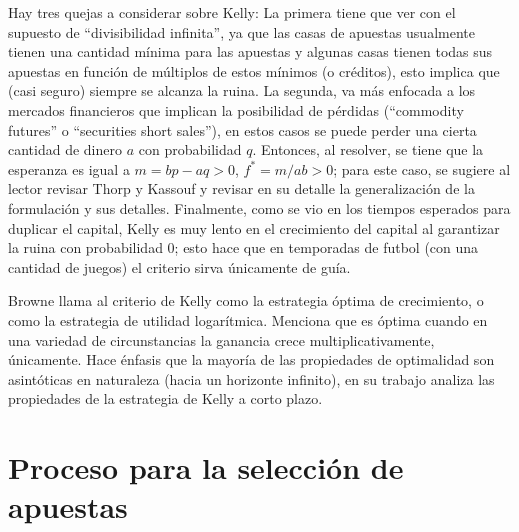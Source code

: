 Hay tres quejas a considerar sobre Kelly: La primera tiene que ver con el supuesto de ``divisibilidad infinita'', ya que las casas de apuestas usualmente tienen una cantidad mínima para las apuestas y algunas casas tienen todas sus apuestas en función de múltiplos de estos mínimos (o créditos), esto implica que  (casi seguro) siempre se alcanza la ruina. La segunda, va más enfocada a los mercados financieros que implican la posibilidad de pérdidas (``commodity futures'' o ``securities short sales''), en estos casos se puede perder una cierta cantidad de dinero $a$ con probabilidad $q$. Entonces, al resolver, se tiene que la esperanza es igual a $m=bp-aq>0$, $f^*=m/ab >0$; para este caso, se sugiere al lector revisar Thorp y Kassouf \cite{thorp1967beat} y revisar en su detalle la generalización de la formulación y sus detalles. Finalmente, como se vio en los tiempos esperados para duplicar el capital, Kelly es muy lento en el crecimiento del capital al garantizar la ruina con probabilidad $0$; esto hace que en temporadas de futbol (con una cantidad de juegos) el criterio sirva únicamente de guía.

Browne \cite{browne2000can} llama al criterio de Kelly \cite{kelly1956new} como la estrategia óptima de crecimiento, o como la estrategia de utilidad logarítmica. Menciona que es óptima cuando en una variedad de circunstancias la ganancia crece multiplicativamente, únicamente. Hace énfasis que la mayoría de las propiedades de optimalidad son asintóticas en naturaleza (hacia un horizonte infinito), en su trabajo analiza las propiedades de la estrategia de Kelly a corto plazo.


 \section{Proceso para la selección de apuestas}

%
%
 
